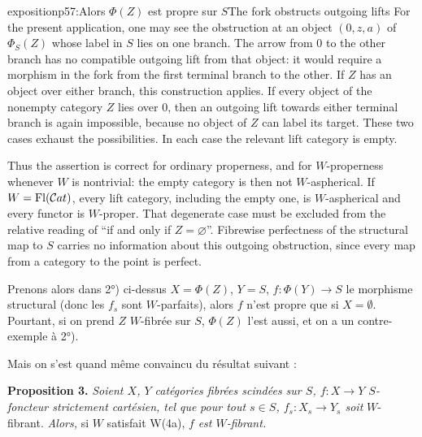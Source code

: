 \begin{itemize}[leftmargin=5em,labelsep=0.5em]
\begin{dcomment}{exposition}{p57:Alors $\Phi(Z)$ est propre sur $S$}{The fork obstructs outgoing lifts}
For the present application, one may see the obstruction at an object $(0,z,a)$ of $\Phi_S(Z)$ whose label in $S$ lies on one branch. The arrow from $0$ to the other branch has no compatible outgoing lift from that object: it would require a morphism in the fork from the first terminal branch to the other. If $Z$ has an object over either branch, this construction applies. If every object of the nonempty category $Z$ lies over $0$, then an outgoing lift towards either terminal branch is again impossible, because no object of $Z$ can label its target. These two cases exhaust the possibilities. In each case the relevant lift category is empty.

Thus the assertion is correct for ordinary properness, and for $W$-properness whenever $W$ is nontrivial: the empty category is then not $W$-aspherical. If $W=\operatorname{Fl}(\mathcal{C}at)$, every lift category, including the empty one, is $W$-aspherical and every functor is $W$-proper. That degenerate case must be excluded from the relative reading of ``if and only if $Z=\varnothing$''. Fibrewise perfectness of the structural map to $S$ carries no information about this outgoing obstruction, since every map from a category to the point is perfect.
\end{dcomment}


Prenons alors dans 2°) ci-dessus $X = \Phi(Z)$, $Y = S$, $f : \Phi(Y) \longrightarrow S$ le morphisme structural (donc les $f_s$ sont $W$-parfaits), alors $f$ n'est propre que si $X = \emptyset$. Pourtant, si on prend $Z$ $W$-fibrée sur $S$, $\Phi(Z)$ l'est aussi, et on a un contre-exemple à 2°).
\end{itemize}

Mais on s'est quand même convaincu du résultat suivant :

\textbf{Proposition 3.} \textit{Soient $X$, $Y$ catégories fibrées scindées sur $S$, $f : X \longrightarrow Y$ $S$-foncteur strictement cartésien, tel que}
\textit{pour tout $s \in S$, $f_s : X_s \longrightarrow Y_s$ soit} $W$-fibrant. \textit{Alors,} si $W$ satisfait W(4a), $f$ \textit{est $W$-fibrant.}

